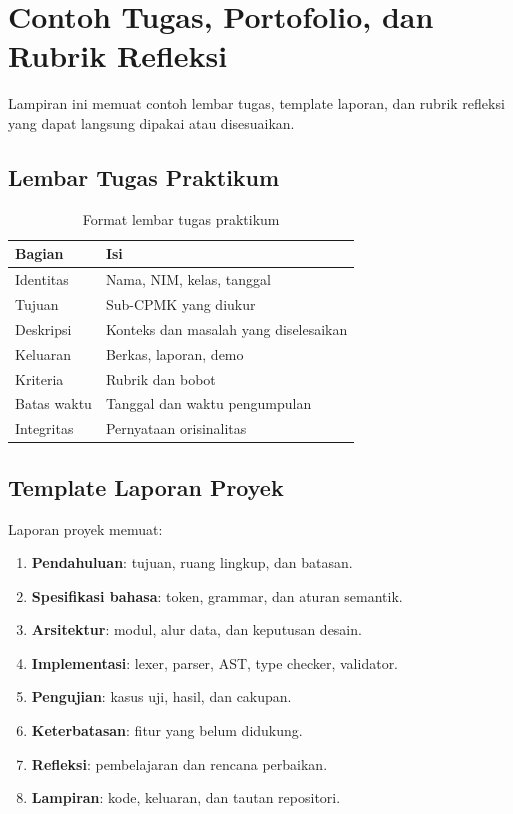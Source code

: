 \chapter{Contoh Tugas, Portofolio, dan Rubrik Refleksi}
\label{app:tugas}

Lampiran ini memuat contoh lembar tugas, template laporan, dan rubrik
refleksi yang dapat langsung dipakai atau disesuaikan.

\section{Lembar Tugas Praktikum}
\label{app:tugas-praktikum}

\begin{table}[H]
\centering
\caption{Format lembar tugas praktikum}
\label{tab:app-tugas-format}
\begin{tabularx}{\textwidth}{@{}lX@{}}
\toprule
\textbf{Bagian} & \textbf{Isi} \\
\midrule
Identitas & Nama, NIM, kelas, tanggal \\
Tujuan & Sub-CPMK yang diukur \\
Deskripsi & Konteks dan masalah yang diselesaikan \\
Keluaran & Berkas, laporan, demo \\
Kriteria & Rubrik dan bobot \\
Batas waktu & Tanggal dan waktu pengumpulan \\
Integritas & Pernyataan orisinalitas \\
\bottomrule
\end{tabularx}
\end{table}

\section{Template Laporan Proyek}
\label{app:tugas-laporan}

Laporan proyek memuat:
\begin{enumerate}[label=\arabic*.,leftmargin=*]
  \item \textbf{Pendahuluan}: tujuan, ruang lingkup, dan batasan.
  \item \textbf{Spesifikasi bahasa}: token, grammar, dan aturan
        semantik.
  \item \textbf{Arsitektur}: modul, alur data, dan keputusan desain.
  \item \textbf{Implementasi}: lexer, parser, AST, type checker,
        validator.
  \item \textbf{Pengujian}: kasus uji, hasil, dan cakupan.
  \item \textbf{Keterbatasan}: fitur yang belum didukung.
  \item \textbf{Refleksi}: pembelajaran dan rencana perbaikan.
  \item \textbf{Lampiran}: kode, keluaran, dan tautan repositori.
\end{enumerate}

